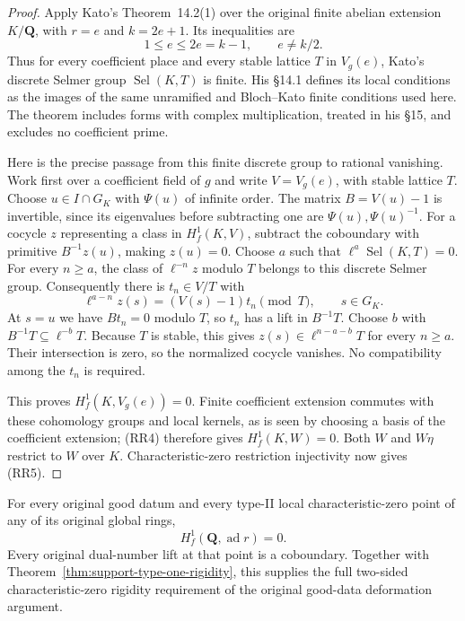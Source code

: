 \begin{proof}
Apply Kato's Theorem~14.2(1) over the original finite abelian
extension $K/\mathbf Q$, with $r=e$ and $k=2e+1$.
Its inequalities are
\[
             1\le e\le2e=k-1,\qquad e\ne k/2.
\]
Thus for every coefficient place and every stable lattice $T$ in
$V_g(e)$, Kato's discrete Selmer group $\operatorname{Sel}(K,T)$
is finite.  His \S14.1 defines its local conditions as the images
of the same unramified and Bloch--Kato finite conditions used here.
The theorem includes forms with complex multiplication, treated
in his \S15, and excludes no coefficient prime.

Here is the precise passage from this finite discrete group to
rational vanishing.  Work first over a coefficient field of $g$ and
write $V=V_g(e)$, with stable lattice $T$.  Choose
$u\in I\cap G_K$ with $\Psi(u)$ of infinite order.
The matrix $B=V(u)-1$ is invertible, since its eigenvalues before
subtracting one are $\Psi(u),\Psi(u)^{-1}$.
For a cocycle $z$ representing a class in $H_f^1(K,V)$,
subtract the coboundary with primitive $B^{-1}z(u)$, making
$z(u)=0$.  Choose $a$ such that $\ell^a\operatorname{Sel}(K,T)=0$.
For every $n\ge a$, the class of $\ell^{-n}z$ modulo $T$ belongs
to this discrete Selmer group.  Consequently there is $t_n\in V/T$
with
\[
   \ell^{a-n}z(s)=(V(s)-1)t_n\pmod T,\qquad s\in G_K.
\]
At $s=u$ we have $Bt_n=0$ modulo $T$, so $t_n$ has a lift in
$B^{-1}T$.  Choose $b$ with $B^{-1}T\subseteq\ell^{-b}T$.
Because $T$ is stable, this gives
$z(s)\in\ell^{n-a-b}T$ for every $n\ge a$.
Their intersection is zero, so the normalized cocycle vanishes.
No compatibility among the $t_n$ is required.

This proves $H_f^1(K,V_g(e))=0$.  Finite coefficient extension
commutes with these cohomology groups and local kernels, as is
seen by choosing a basis of the coefficient extension; (RR4)
therefore gives $H_f^1(K,W)=0$.  Both $W$ and $W\eta$ restrict
to $W$ over $K$.  Characteristic-zero restriction injectivity
now gives (RR5).
\end{proof}

\begin{theorem}
\label{thm:support-type-two-rigidity}
For every original good datum and every type-II local
characteristic-zero point of any of its original global rings,
\[
                    H_f^1(\mathbf Q,\operatorname{ad}r)=0.
                                                               \tag{RR6}
\]
Every original dual-number lift at that point is a coboundary.
Together with Theorem~\ref{thm:support-type-one-rigidity}, this
supplies the full two-sided characteristic-zero rigidity requirement
of the original good-data deformation argument.
\end{theorem}

